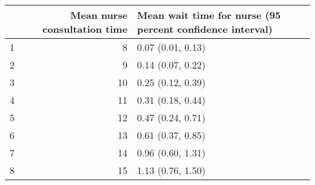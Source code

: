 \begin{table}[ht]
\centering
\begin{tabular}{rrl}
  \hline
 & Mean nurse consultation time & Mean wait time for nurse (95 percent confidence interval) \\ 
  \hline
1 &   8 & 0.07 (0.01, 0.13) \\ 
  2 &   9 & 0.14 (0.07, 0.22) \\ 
  3 &  10 & 0.25 (0.12, 0.39) \\ 
  4 &  11 & 0.31 (0.18, 0.44) \\ 
  5 &  12 & 0.47 (0.24, 0.71) \\ 
  6 &  13 & 0.61 (0.37, 0.85) \\ 
  7 &  14 & 0.96 (0.60, 1.31) \\ 
  8 &  15 & 1.13 (0.76, 1.50) \\ 
   \hline
\end{tabular}
\end{table}
